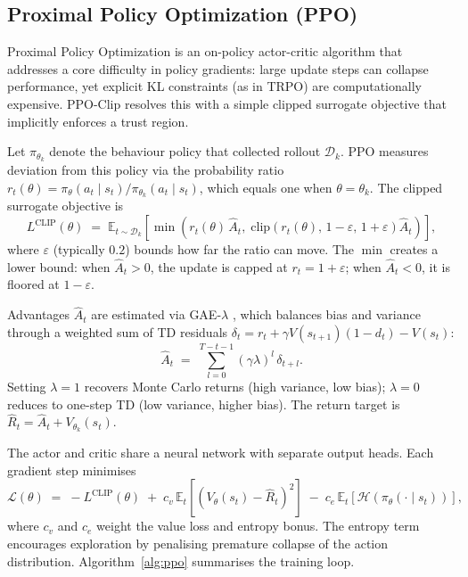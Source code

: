\documentclass{article}
\begin{document}
\subsection{Proximal Policy Optimization (PPO)}


Proximal Policy Optimization \citep{schulman2017proximal} is an on-policy actor-critic algorithm that addresses a core difficulty in policy gradients: large update steps can collapse performance, yet explicit KL constraints (as in TRPO) are computationally expensive. PPO-Clip resolves this with a simple clipped surrogate objective that implicitly enforces a trust region.

Let $\pi_{\theta_k}$ denote the behaviour policy that collected rollout $\mathcal{D}_k$. PPO measures deviation from this policy via the probability ratio $r_t(\theta) = \pi_\theta(a_t \mid s_t) / \pi_{\theta_k}(a_t \mid s_t)$, which equals one when $\theta = \theta_k$. The clipped surrogate objective is
\begin{equation}
    L^{\mathrm{CLIP}}(\theta)
    \;=\; \mathbb{E}_{t \sim \mathcal{D}_k}
    \!\left[
        \min\!\left(
            r_t(\theta)\,\hat{A}_t,\;
            \mathrm{clip}\!\left(r_t(\theta),\,1-\varepsilon,\,1+\varepsilon\right)\hat{A}_t
        \right)
    \right],
    \label{eq:ppo-clip}
\end{equation}
where $\varepsilon$ (typically $0.2$) bounds how far the ratio can move. The $\min$ creates a lower bound: when $\hat{A}_t > 0$, the update is capped at $r_t = 1+\varepsilon$; when $\hat{A}_t < 0$, it is floored at $1-\varepsilon$.

Advantages $\hat{A}_t$ are estimated via GAE-$\lambda$ \citep{schulman2016gae}, which balances bias and variance through a weighted sum of TD residuals $\delta_t = r_t + \gamma V(s_{t+1})(1-d_t) - V(s_t)$:
\begin{equation}
    \hat{A}_t \;=\; \sum_{l=0}^{T-t-1} (\gamma\lambda)^l\,\delta_{t+l}.
    \label{eq:gae}
\end{equation}
Setting $\lambda = 1$ recovers Monte Carlo returns (high variance, low bias); $\lambda = 0$ reduces to one-step TD (low variance, higher bias). The return target is $\hat{R}_t = \hat{A}_t + V_{\theta_k}(s_t)$.

The actor and critic share a neural network with separate output heads. Each gradient step minimises
\begin{equation}
    \mathcal{L}(\theta)
    \;=\; -L^{\mathrm{CLIP}}(\theta)
    \;+\; c_v\,\mathbb{E}_t\!\left[\left(V_\theta(s_t) - \hat{R}_t\right)^2\right]
    \;-\; c_e\,\mathbb{E}_t\!\left[\mathcal{H}\!\left(\pi_\theta(\cdot \mid s_t)\right)\right],
    \label{eq:ppo-loss}
\end{equation}
where $c_v$ and $c_e$ weight the value loss and entropy bonus. The entropy term encourages exploration by penalising premature collapse of the action distribution. Algorithm~\ref{alg:ppo} summarises the training loop.
\end{document}
